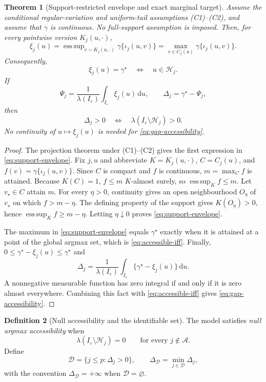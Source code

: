 \documentclass[11pt]{article}
\newtheorem{theorem}{Theorem}[section]
\theoremstyle{definition}\newtheorem{definition}[theorem]{Definition}
\DeclareMathOperator*{\esssup}{ess\,sup}
\newcommand{\I}{I_\varepsilon}
\newcommand{\gmax}{\gamma^\star}
\newcommand{\A}{\mathcal A}
\newcommand{\D}{\mathcal D}
\begin{document}
\begin{theorem}[Support-restricted envelope and exact marginal target]
\label{thm:support-envelope}
Assume the conditional regular-variation and uniform-tail assumptions
(C1)--(C2), and assume that $\gamma$ is continuous.  No full-support
assumption is imposed.  Then, for every pointwise version $K_j(u,\cdot)$,
\begin{equation}
 \xi_j(u)
 =\esssup_{v\sim K_j(u,\cdot)}\gamma\{\iota_j(u,v)\}
 =\max_{v\in C_j(u)}\gamma\{\iota_j(u,v)\}.
 \label{eq:support-envelope}
\end{equation}
Consequently,
\begin{equation}
 \xi_j(u)=\gmax\quad\Longleftrightarrow\quad u\in\mathcal H_j.
 \label{eq:accessible-iff}
\end{equation}
If
\[
 \Psi_j=\frac1{\lambda(\I)}\int_{\I}\xi_j(u)\,\mathrm du,
 \qquad
 \Delta_j=\gmax-\Psi_j,
\]
then
\begin{equation}
 \Delta_j>0
 \quad\Longleftrightarrow\quad
 \lambda(\I\setminus\mathcal H_j)>0.
 \label{eq:gap-accessibility}
\end{equation}
No continuity of $u\mapsto\xi_j(u)$ is needed for
\eqref{eq:gap-accessibility}.
\end{theorem}

\begin{proof}
The projection theorem under (C1)--(C2) gives the first expression in
\eqref{eq:support-envelope}.  Fix $j,u$ and abbreviate
$K=K_j(u,\cdot)$, $C=C_j(u)$, and
$f(v)=\gamma\{\iota_j(u,v)\}$.  Since $C$ is compact and $f$ is continuous,
$m=\max_C f$ is attained.  Because $K(C)=1$, $f\le m$ $K$-almost surely, so
$\esssup_K f\le m$.  Let $v_\star\in C$ attain $m$.  For every $\eta>0$,
continuity gives an open neighbourhood $O_\eta$ of $v_\star$ on which
$f>m-\eta$.  The defining property of the support gives
$K(O_\eta)>0$, hence $\esssup_Kf\ge m-\eta$.  Letting $\eta\downarrow0$
proves \eqref{eq:support-envelope}.

The maximum in \eqref{eq:support-envelope} equals $\gmax$ exactly when it is
attained at a point of the global argmax set, which is
\eqref{eq:accessible-iff}.  Finally, $0\le\gmax-\xi_j(u)\le\gmax$ and
\[
 \Delta_j=\frac1{\lambda(\I)}\int_{\I}\{\gmax-\xi_j(u)\}\,\mathrm du.
\]
A nonnegative measurable function has zero integral if and only if it is zero
almost everywhere.  Combining this fact with \eqref{eq:accessible-iff}
gives \eqref{eq:gap-accessibility}.
\end{proof}

\begin{definition}[Null accessibility and the identifiable set]
\label{def:identifiable}
The model satisfies \emph{null argmax accessibility} when
\begin{equation}
 \lambda(\I\setminus\mathcal H_j)=0
 \qquad\text{for every }j\notin\A.
 \tag{NA}
\end{equation}
Define
\begin{equation}
 \D=\{j\le p:\Delta_j>0\},
 \qquad
 \Delta_{\D}=\min_{j\in\D}\Delta_j,
 \label{eq:Dset}
\end{equation}
with the convention $\Delta_{\D}=+\infty$ when $\D=\varnothing$.
\end{definition}
\end{document}
